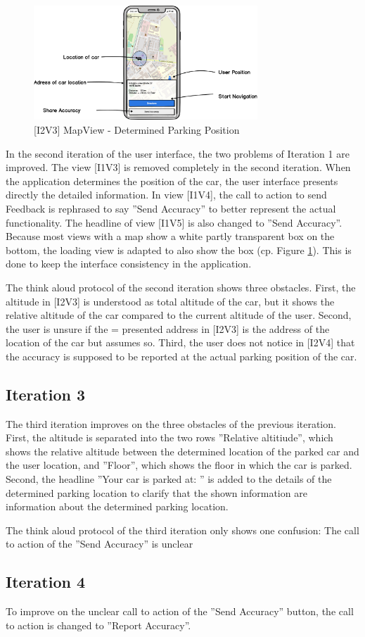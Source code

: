 \begin{figure}[H]
    \centering
    \includegraphics[width=0.75\textwidth]{images/UI/[I2V3]MapView-DeterminedParkingPosition.png}
    \caption{[I2V3] MapView - Determined Parking Position}
    \label{fig:i2v1}
\end{figure}



In the second iteration of the user interface, the two problems of Iteration 1 are improved. The view [I1V3] is removed completely in the second iteration. When the application determines the position of the car, the user interface presents directly the detailed information.  In view [I1V4], the call to action to send Feedback is rephrased to say  ''Send Accuracy'' to better represent the actual functionality. The headline of view [I1V5] is also changed to ''Send Accuracy''. Because most views with a map show a white partly transparent box on the bottom, the loading view is adapted to also show the box (cp. Figure \ref{fig:i2v1}). This is done to keep the interface consistency in the application. 

The think aloud protocol of the second iteration shows three obstacles. First, the altitude in [I2V3] is understood as total altitude of the car, but it shows the relative altitude of the car compared to the current altitude of the user. Second, the user is unsure if the = presented address in [I2V3] is the address of the location of the car but assumes so. Third, the user does not notice in [I2V4] that the accuracy is supposed to be reported at the actual parking position of the car.

\subsection{Iteration 3}


The third iteration improves on the three obstacles of the previous iteration. 
First, the altitude is separated into the two rows ''Relative altitiude'', which shows the relative altitude between the determined location of the parked car and the user location, and ''Floor'', which shows the floor in which the car is parked. Second, the headline ''Your car is parked at: '' is added to the details of the determined parking location to clarify that the shown information are information about the determined parking location. 

The think aloud protocol of the third iteration only shows one confusion: The call to action of the ''Send Accuracy'' is unclear

\subsection{Iteration 4}

To improve on the unclear call to action of the ''Send Accuracy'' button, the call to action is changed to ''Report Accuracy''.
